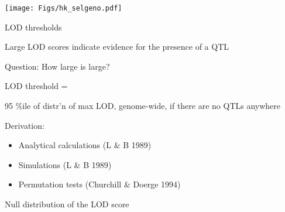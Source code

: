 \documentclass[12pt]{article}
\newcommand{\headsize}{\fontsize{35}{35} \selectfont}
\newcommand{\smallersize}{\fontsize{20}{25} \selectfont}
\begin{document}
\vfill

\centerline{\texttt{[image: Figs/hk\_selgeno.pdf]}}







\newpage

\headsize \color{myyellow}
\hfill \begin{minipage}{5.75in}
\centering
LOD thresholds
\end{minipage}

\smallersize \color{mywhite}

\vspace{25mm}

\hfill
\begin{minipage}{10in}
Large LOD scores indicate evidence for the presence of a QTL
\vspace{5mm}

{\color{mypink} Question}: How large is large?
\vspace{20mm}

{\color{myyellow} LOD threshold} =  \hspace{2mm}
\begin{minipage}[t]{7in}
\setlength{\rightskip}{0pt plus 1fil} %
95 \%ile of distr'n of max LOD, genome-wide, if there are no QTLs anywhere
\end{minipage}
\vspace{20mm}

\hspace{15mm} {\color{myyellow} Derivation:} \hfill
\begin{minipage}[t]{7.5in}
\begin{itemize}
\item Analytical calculations (L \& B 1989)
\item Simulations (L \& B 1989)
\item Permutation tests (Churchill \& Doerge 1994)
\end{itemize} \end{minipage}
\end{minipage}



\newpage

\headsize \color{myyellow}
\hfill \begin{minipage}{5.75in}
\centering
Null distribution of the LOD score
\end{minipage}

\vspace{3cm}
\end{document}
